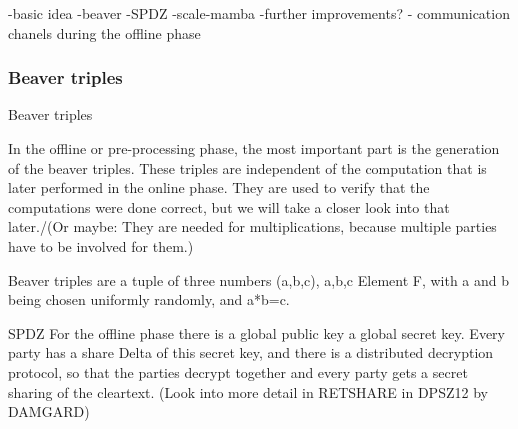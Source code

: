 \documentclass[english,runningheads,a4paper]{llncs}[2018/03/10]
\begin{document}
-basic idea
-beaver
-SPDZ
-scale-mamba
-further improvements?
- communication chanels during the offline phase


\subsubsection{Beaver triples}

Beaver triples 




In the offline or pre-processing phase, the most important part is the generation of the beaver triples. These triples  are independent of the computation that is later performed in the online phase. They are used to verify that the computations were done correct, but we will take a closer look into that later./(Or maybe: They are needed for multiplications, because multiple parties have to be involved for them.)

Beaver triples are a tuple of three numbers (a,b,c), a,b,c Element F, with a and b being chosen uniformly randomly, and a*b=c.

SPDZ
For the offline phase there is a global public key a global secret key. Every party has a share Delta of this secret key, and there is a distributed decryption protocol, so that the parties decrypt together and every party gets a secret sharing of the cleartext. (Look into more detail in RETSHARE in DPSZ12 by DAMGARD)
\end{document}
